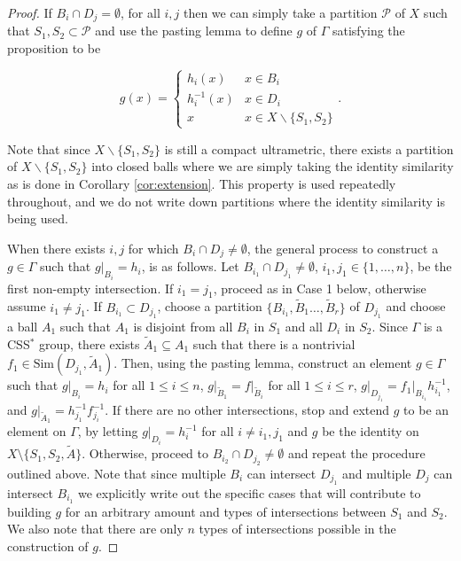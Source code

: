 \documentclass[12pt]{amsart}
\numberwithin{equation}{subsection}
\theoremstyle{definition}
\theoremstyle{definition}
\theoremstyle{remark}
\begin{document}
\begin{proof}

    If $B_i \cap D_j = \emptyset$, for all $i,j$ then we can simply take a partition $\mathcal P$ of $X$ such that $S_1, S_2 \subset \mathcal P$ and use the pasting lemma to define $g$ of $\Gamma$ satisfying the proposition to be
    
    \[ g(x) = \begin{cases} h_i(x) & x \in B_i \\
    h_i^{-1}(x) & x \in D_i \\
    x & x \in X \backslash \{S_1, S_2\}
    \end{cases}.
    \]  

    Note that since $X \backslash \{S_1, S_2\}$ is still a compact ultrametric, there exists a partition of $X \backslash \{S_1, S_2\}$ into closed balls where we are simply taking the identity similarity as is done in Corollary \ref{cor:extension}. This property is used repeatedly throughout, and we do not write down partitions where the identity similarity is being used.
    

    When there exists $i,j$ for which $B_i \cap D_j \neq \emptyset$, the general process to construct a $g \in \Gamma$ such that $g\vert_{B_i} =h_i$, is as follows. Let $B_{i_1} \cap D_{j_1} \neq \emptyset$, $i_1,j_1 \in \{ 1, \dots , n\}$, be the first non-empty intersection. If $i_1=j_1$, proceed as in Case 1 below, otherwise assume $i_1 \neq j_1$. If $B_{i_1} \subset D_{j_1}$, choose a partition $\{B_{i_1}, \tilde B_1\dots ,\tilde B_r \}$ of $D_{j_1}$ and choose a ball $A_1$ such that $A_1$ is disjoint from all $B_i$ in $S_1$ and all $D_i$ in $S_2$. Since $\Gamma$ is a CSS$^*$ group, there exists $\tilde A_1 \subseteq A_1$ such that there is a nontrivial $f_1 \in \text{Sim}(D_{j_1},\tilde A_1)$. Then, using the pasting lemma, construct an element $g \in \Gamma$ such that $g\vert_{B_i} =h_{i}$ for all $1 \leq i \leq n$, $g\vert_{\tilde B_1} = f\vert_{\tilde B_i}$ for all $1 \leq i \leq r$, $g\vert_{D_{j_1}} = f_1\vert_{B_{i_1}}h^{-1}_{i_1}$, and $g\vert_{\tilde A_1} =h_{j_1}^{-1}f_{j_i}^{-1}$. If there are no other intersections, stop and extend $g$ to be an element on $\Gamma$, by letting $g\vert_{D_i} = h_i^{-1}$ for all $i \neq i_1,j_1$ and $g$ be the identity on $X \setminus\{S_1, S_2, \tilde A\}$. Otherwise, proceed to $B_{i_2}\cap D_{j_2} \neq \emptyset$ and repeat the procedure outlined above. Note that since multiple $B_i$ can intersect $D_{j_1}$ and multiple  $D_j$ can intersect $B_{i_1}$ we explicitly write out the specific cases that will contribute to building $g$ for an arbitrary amount and types of intersections between $S_1$ and $S_2$. We also note that there are only $n$ types of intersections possible in the construction of $g$.
    

\end{proof}
\end{document}
